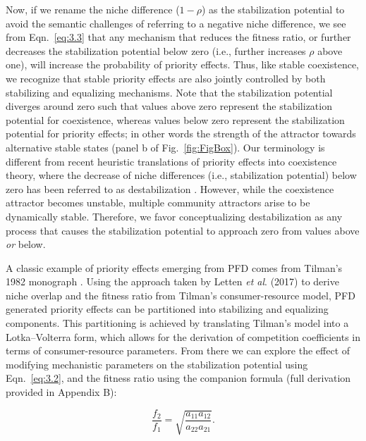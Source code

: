 \noindent Now, if we rename the niche difference ($1-\rho$) as the stabilization potential to avoid the semantic challenges of referring to a negative niche difference, we see from Eqn.~\ref{eq:3.3} that any mechanism that reduces the fitness ratio, or further decreases the stabilization potential below zero (i.e., further increases $\rho$ above one), will increase the probability of priority effects. Thus, like stable coexistence, we recognize that stable priority effects are also jointly controlled by both stabilizing and equalizing mechanisms. Note that the stabilization potential diverges around zero such that values above zero represent the stabilization potential for coexistence, whereas values below zero represent the stabilization potential for priority effects; in other words the strength of the attractor towards alternative stable states (panel b of Fig.~\ref{fig:FigBox}). Our terminology is different from recent heuristic translations of priority effects into coexistence theory, where the decrease of niche differences (i.e., stabilization potential) below zero has been referred to as destabilization \citep{Mordecai2011, Fukami2016}. However, while the coexistence attractor becomes unstable, multiple community attractors arise to be dynamically stable. Therefore, we favor conceptualizing destabilization as any process that causes the stabilization potential to approach zero from values above \textit{or} below. 
\par
 
 
A classic example of priority effects emerging from PFD comes from Tilman's 1982 monograph \cite{tilman1982}. Using the approach taken by Letten \textit{et al}. (2017) to derive niche overlap and the fitness ratio from Tilman's consumer-resource model, PFD generated priority effects can be partitioned into stabilizing and equalizing components. This partitioning is achieved by translating Tilman's model into a Lotka--Volterra form, which allows for the derivation of competition coefficients in terms of consumer-resource parameters. From there we can explore the effect of modifying mechanistic parameters on the stabilization potential using Eqn.~\ref{eq:3.2}, and the fitness ratio using the companion formula \citep{Chesson2008b, Chesson2013ecosys} (full derivation provided in Appendix B):

\begin{equation}
\frac{f_{2}}{f_{1}}=\sqrt {\frac{{{a_{11}}{a_{12}}}}{{{a_{22}}{a_{21}}}}}.
\tag{3.4}\label{eq:3.4}
\end{equation}

